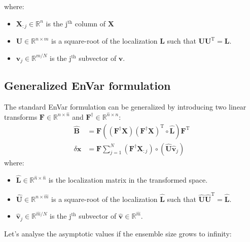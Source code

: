 \documentclass[12pt]{scrartcl}
\begin{document}
where:
\begin{itemize}
\item $\mathbf{X}_{:j} \in \mathbb{R}^n$ is the j$^\text{th}$ column of $\mathbf{X}$
\item $\mathbf{U} \in \mathbb{R}^{n \times m}$ is a square-root of the localization $\mathbf{L}$ such that $\mathbf{U} \mathbf{U}^\mathrm{T} = \mathbf{L}$.
\item $\mathbf{v}_j \in \mathbb{R}^{m/N}$ is the j$^\text{th}$ subvector of $\mathbf{v}$.
\end{itemize}

\subsection{Generalized EnVar formulation}
The standard EnVar formulation can be generalized by introducing two linear transforms $\mathbf{F} \in \mathbb{R}^{n \times \widehat{n}}$ and $\mathbf{F}^\dag \in \mathbb{R}^{\widehat{n} \times n}$:
\begin{align}
\widehat{\mathbf{B}} & = \mathbf{F} \left(\left(\mathbf{F}^\dag \mathbf{X}\right) \left(\mathbf{F}^\dag \mathbf{X}\right)^\mathrm{T} \circ \widehat{\mathbf{L}}\right) \mathbf{F}^\mathrm{T} \\
\delta \mathbf{x} & = \mathbf{F} \sum_{j=1}^N \left(\mathbf{F}^\dag \mathbf{X}_{:j}\right) \circ \left(\widehat{\mathbf{U}} \widehat{\mathbf{v}}_j\right)
\end{align}
where: 
\begin{itemize}
\item $\widehat{\mathbf{L}} \in \mathbb{R}^{\widehat{n} \times \widehat{n}}$ is the localization matrix in the transformed space.
\item $\widehat{\mathbf{U}} \in \mathbb{R}^{n \times \widehat{m}}$ is a square-root of the localization $\widehat{\mathbf{L}}$ such that $\widehat{\mathbf{U}} \widehat{\mathbf{U}}^\mathrm{T} = \widehat{\mathbf{L}}$.
\item $\widehat{\mathbf{v}}_j \in \mathbb{R}^{\widehat{m}/N}$ is the j$^\text{th}$ subvector of $\widehat{\mathbf{v}} \in \mathbb{R}^{\widehat{m}}$.
\end{itemize}
Let's analyse the asymptotic values if the ensemble size grows to infinity:
\end{document}
